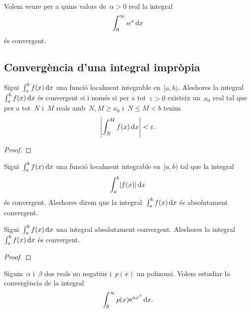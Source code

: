 \documentclass[../../Main.tex]{subfiles}
\begin{document}
	\begin{example}
		\label{ex:criteri de la integral per integrals impròpies}
		Volem veure per a quins valors de~\(\alpha>0\) real la integral
		\begin{equation}
			\label{ex:criteri de la integral per integrals impròpies:eq1}
			\int_{0}^{\infty}\alpha^{x}\mathop{}\!\mathrm{d} x
		\end{equation}
		és convergent.
		\begin{solution}
		\end{solution}
	\end{example}
	\subsection{Convergència d'una integral impròpia}
	\begin{theorem}
		\label{thm:Condició de Cauchy per integrals impròpies}
		Sigui~\(\int_{a}^{b}f(x)\mathop{}\!\mathrm{d} x\) una funció localment integrable en~\([a,b)\).
		Aleshores la integral~\(\int_{a}^{b}f(x)\mathop{}\!\mathrm{d} x\) és convergent si i només si per a tot~\(\varepsilon>0\) existeix un~\(x_{0}\) real tal que per a tot~\(N\) i~\(M\) reals amb~\(N,M\geq x_{0}\) i~\(N\leq M<b\) tenim
		\[
		    \abs{\int_{N}^{M}f(x)\diff x}<\varepsilon.
		\]
		\begin{proof}
		\end{proof}
	\end{theorem}
	\begin{definition}
		\label{def:convergència absoluta d'una integral impròpia}
		Sigui~\(\int_{a}^{b}f(x)\mathop{}\!\mathrm{d} x\) una funció localment integrable en~\([a,b)\) tal que la integral
		\[
		    \int_{a}^{b}\abs{f(x)}\diff x
		\]
		és convergent.
		Aleshores direm que la integral~\(\int_{a}^{b}f(x)\mathop{}\!\mathrm{d} x\) és absolutament convergent.
	\end{definition}
	\begin{proposition}
		Sigui~\(\int_{a}^{b}f(x)\mathop{}\!\mathrm{d} x\) una integral absolutament convergent.
		Aleshores la integral~\(\int_{a}^{b}f(x)\mathop{}\!\mathrm{d} x\) és convergent.
		\begin{proof}
		\end{proof}
	\end{proposition}
	\begin{example}
		\label{ex:convèrgencia absoluta d'una integral impròpia amb un polinomi i una exponencial}
		Siguin~\(\alpha\) i~\(\beta\) dos reals no negatius i~\(p(x)\) un polinomi.
		Volem estudiar la convergència de la integral
		\[
		    \int_{0}^{\infty}p(x)\mathrm{e}^{\alpha x^{\beta}}\mathop{}\!\mathrm{d} x.
		\]
		\begin{solution}
		\end{solution}
	\end{example}
\end{document}

